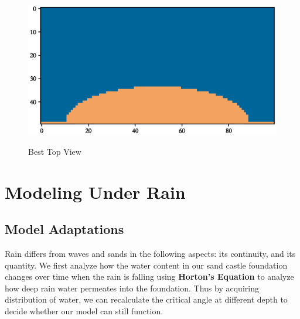 \documentclass[12pt]{article}
\begin{document}
\begin{figure}[H]
    \centering
    \caption{Best Top View}
    \includegraphics[width=\linewidth]{result.eps}
    \label{fig:result}
\end{figure}

\section{Modeling Under Rain}
\subsection{Model Adaptations}
Rain differs from waves and sands in the following aspects: its continuity, and its quantity. We first analyze how the water content in our sand castle foundation changes over time when the rain is falling using \textbf{Horton's Equation} to analyze how deep rain water permeates into the foundation. Thus by acquiring distribution of water, we can recalculate the critical angle at different depth to decide whether our model can still function.
\end{document}
